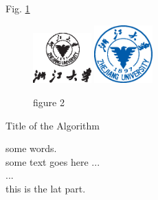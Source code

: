 \documentclass[UTF8,a4paper,10pt, twocolumn]{ctexart}
\begin{document}
     Fig. \ref{figure:zju2}
	\begin{figure}[htbp] 		
		\centering
		\includegraphics[width=0.2\textwidth]{fig/ZJU_BLACK.eps}
		\includegraphics[width=0.2\textwidth]{fig/ZJU_BLUE.eps}
		\caption{figure 2}
		\label{figure:zju2}		
	\end{figure}

	\begin{algorithm}
		\caption{Title of the Algorithm}
		\label{algo:ref}
		\begin{algorithmic}[1]
			\REQUIRE some words.  %
			\ENSURE ~\\           %
			some text goes here ... \\
			\STATE ... \\  %
			\ENDWHILE
			\RETURN this is the lat part.  %
		\end{algorithmic}
	\end{algorithm}
\end{document}
